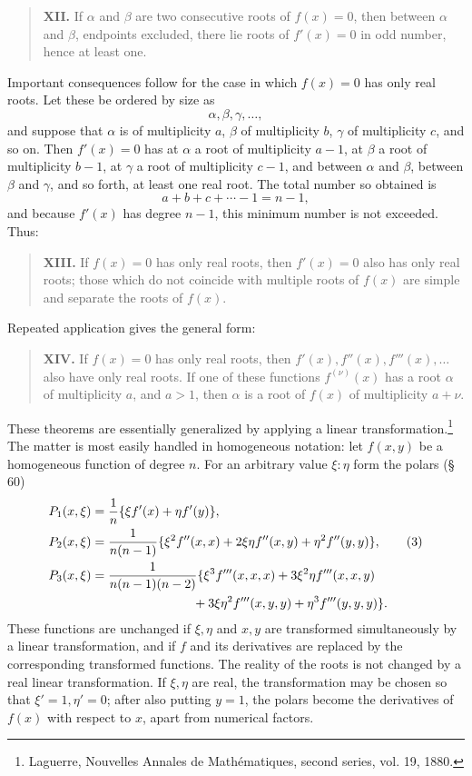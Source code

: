 \documentclass[11pt]{article}
\begin{document}
\begin{quote}
\textbf{XII.} If $\alpha$ and $\beta$ are two consecutive roots of $f(x)=0$, then between $\alpha$ and $\beta$, endpoints excluded, there lie roots of $f'(x)=0$ in odd number, hence at least one.
\end{quote}

Important consequences follow for the case in which $f(x)=0$ has only real roots. Let these be ordered by size as
\[
        \alpha,\beta,\gamma,\ldots,
\]
and suppose that $\alpha$ is of multiplicity $a$, $\beta$ of multiplicity $b$, $\gamma$ of multiplicity $c$, and so on. Then $f'(x)=0$ has at $\alpha$ a root of multiplicity $a-1$, at $\beta$ a root of multiplicity $b-1$, at $\gamma$ a root of multiplicity $c-1$, and between $\alpha$ and $\beta$, between $\beta$ and $\gamma$, and so forth, at least one real root. The total number so obtained is
\[
        a+b+c+\cdots-1=n-1,
\]
and because $f'(x)$ has degree $n-1$, this minimum number is not exceeded. Thus:

\begin{quote}
\textbf{XIII.} If $f(x)=0$ has only real roots, then $f'(x)=0$ also has only real roots; those which do not coincide with multiple roots of $f(x)$ are simple and separate the roots of $f(x)$.
\end{quote}

Repeated application gives the general form:

\begin{quote}
\textbf{XIV.} If $f(x)=0$ has only real roots, then $f'(x),f''(x),f'''(x),\ldots$ also have only real roots. If one of these functions $f^{(\nu)}(x)$ has a root $\alpha$ of multiplicity $a$, and $a>1$, then $\alpha$ is a root of $f(x)$ of multiplicity $a+\nu$.
\end{quote}

These theorems are essentially generalized by applying a linear transformation.\footnote{Laguerre, Nouvelles Annales de Mathématiques, second series, vol. 19, 1880.} The matter is most easily handled in homogeneous notation: let $f(x,y)$ be a homogeneous function of degree $n$. For an arbitrary value $\xi:\eta$ form the polars (\S\,60)
\begin{align}
P_1(x,\xi)&=\frac1n\{\xi f'(x)+\eta f'(y)\},\notag\\
P_2(x,\xi)&=\frac{1}{n(n-1)}\{\xi^2f''(x,x)+2\xi\eta f''(x,y)+\eta^2 f''(y,y)\},\tag{3}\\
P_3(x,\xi)&=\frac{1}{n(n-1)(n-2)}
\{\xi^3 f'''(x,x,x)+3\xi^2\eta f'''(x,x,y)\notag\\
&\hspace{8em}+3\xi\eta^2 f'''(x,y,y)+\eta^3 f'''(y,y,y)\}.
\notag
\end{align}
These functions are unchanged if $\xi,\eta$ and $x,y$ are transformed simultaneously by a linear transformation, and if $f$ and its derivatives are replaced by the corresponding transformed functions. The reality of the roots is not changed by a real linear transformation. If $\xi,\eta$ are real, the transformation may be chosen so that $\xi'=1,\eta'=0$; after also putting $y=1$, the polars become the derivatives of $f(x)$ with respect to $x$, apart from numerical factors.
\end{document}
